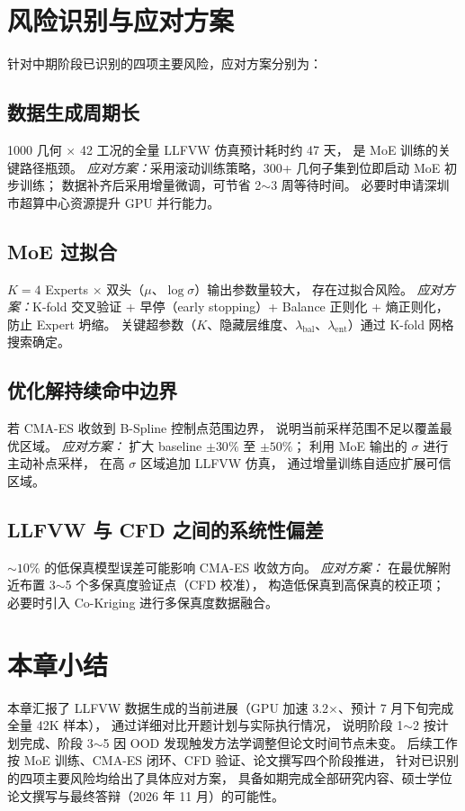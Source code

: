 \section{风险识别与应对方案}

针对中期阶段已识别的四项主要风险，应对方案分别为：

\subsection{数据生成周期长}

1000 几何 $\times$ 42 工况的全量 LLFVW 仿真预计耗时约 47 天，
是 MoE 训练的关键路径瓶颈。
\emph{应对方案：}采用滚动训练策略，300+ 几何子集到位即启动 MoE 初步训练；
数据补齐后采用增量微调，可节省 2$\sim$3 周等待时间。
必要时申请深圳市超算中心资源提升 GPU 并行能力。

\subsection{MoE 过拟合}

$K = 4$ Experts $\times$ 双头（$\mu$、$\log\sigma$）输出参数量较大，
存在过拟合风险。
\emph{应对方案：}K-fold 交叉验证 + 早停（early stopping）+ Balance 正则化 + 熵正则化，
防止 Expert 坍缩。
关键超参数（$K$、隐藏层维度、$\lambda_{\text{bal}}$、$\lambda_{\text{ent}}$）通过 K-fold 网格搜索确定。

\subsection{优化解持续命中边界}

若 CMA-ES 收敛到 B-Spline 控制点范围边界，
说明当前采样范围不足以覆盖最优区域。
\emph{应对方案：}
扩大 baseline $\pm 30\%$ 至 $\pm 50\%$；
利用 MoE 输出的 $\sigma$ 进行主动补点采样，
在高 $\sigma$ 区域追加 LLFVW 仿真，
通过增量训练自适应扩展可信区域。

\subsection{LLFVW 与 CFD 之间的系统性偏差}

$\sim 10\%$ 的低保真模型误差可能影响 CMA-ES 收敛方向。
\emph{应对方案：}
在最优解附近布置 3$\sim$5 个多保真度验证点（CFD 校准），
构造低保真到高保真的校正项；
必要时引入 Co-Kriging 进行多保真度数据融合。

\section{本章小结}

本章汇报了 LLFVW 数据生成的当前进展（GPU 加速 3.2$\times$、预计 7 月下旬完成全量 42K 样本），
通过详细对比开题计划与实际执行情况，
说明阶段 1$\sim$2 按计划完成、阶段 3$\sim$5 因 OOD 发现触发方法学调整但论文时间节点未变。
后续工作按 MoE 训练、CMA-ES 闭环、CFD 验证、论文撰写四个阶段推进，
针对已识别的四项主要风险均给出了具体应对方案，
具备如期完成全部研究内容、硕士学位论文撰写与最终答辩（2026 年 11 月）的可能性。
